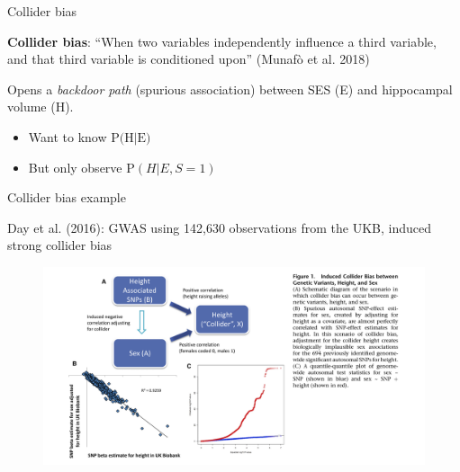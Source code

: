 \documentclass[
  ignorenonframetext,
]{beamer}
\providecommand{\tightlist}{%
  \setlength{\itemsep}{0pt}\setlength{\parskip}{0pt}}
\begin{document}
\begin{frame}{Collider bias}
\protect\hypertarget{collider-bias}{}

\begin{figure}
\centering
{}
\end{figure}

\textbf{Collider bias}: ``When two variables independently influence a
third variable, and that third variable is conditioned upon'' (Munafò et
al. 2018)

Opens a \emph{backdoor path} (spurious association) between SES (E) and
hippocampal volume (H).

\begin{itemize}
\tightlist
\item
  Want to know \(\text{P(H|E)}\)
\item
  But only observe \(\text{P}(H | E, S = 1)\)
\end{itemize}

\end{frame}

\begin{frame}{Collider bias example}
\protect\hypertarget{collider-bias-example}{}

Day et al. (2016): GWAS using 142,630 observations from the UKB, induced
strong collider bias

\begin{figure}
\centering
\includegraphics[width=\textwidth]{collider_bias_example.png}
\end{figure}

\end{frame}
\end{document}
